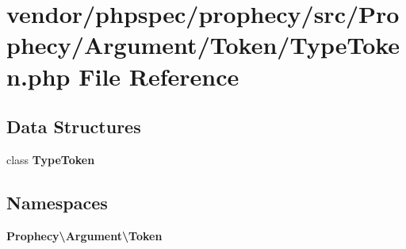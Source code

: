 \section{vendor/phpspec/prophecy/src/\+Prophecy/\+Argument/\+Token/\+Type\+Token.php File Reference}
\label{_type_token_8php}
\subsection*{Data Structures}
\begin{DoxyCompactItemize}
\item 
class {\bf Type\+Token}
\end{DoxyCompactItemize}
\subsection*{Namespaces}
\begin{DoxyCompactItemize}
\item 
 {\bf Prophecy\textbackslash{}\+Argument\textbackslash{}\+Token}
\end{DoxyCompactItemize}
